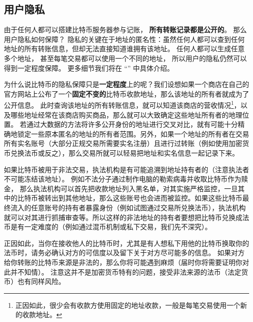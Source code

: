 \subsection{用户隐私}
由于任何人都可以搭建比特币服务器参与记账， \textbf{所有转账记录都是公开的}。 那么用户隐私如何保障？ 隐私的关键在于地址的匿名性：虽然任何人都可以查到任何地址的所有转账信息，但却无法直接知道谁拥有该地址。 任何人都可以生成任意多个地址， 甚至每笔交易都可以使用一个不同的地址， 所以用户的隐私仍然可以得到一定程度保障。 更多细节我们将在 “” 中具体介绍。

为什么说比特币的隐私保障只是\textbf{一定程度}上的呢？我们设想如果一个商店在自己的官方网站上公布了一个\textbf{固定不变的}比特币收款地址，那么该地址的所有者就成为了公开信息。 此时查询该地址的所有转账信息，就可以知道该商店的营收情况\footnote{正因如此，很少会有收款方使用固定的地址收款，一般是每笔交易使用一个新的收款地址。}，以及哪些地址经常在该商店购买商品，那么就可以大致确定这些地址所有者的地理位置。 若通过大数据的方法将许多公开身份的地址进行交叉对比，就有可能十分精确地锁定一些原本匿名的地址的所有者范围。另外，如果一个地址的所有者在交易所有实名账号（大部分正规交易所需要实名注册）且进行过转账（例如使用加密货币兑换法币或反之），那么交易所就可以轻易把地址和实名信息一起记录下来。

如果比特币被用于非法交易，执法机构是有可能追溯到地址持有者的（注意执法者不可能冻结该地址）。 例如不法分子通过制作电脑的勒索病毒并收取比特币作为赎金， 那么执法机构可以首先把收款地址列入黑名单，对其实施严格监控，一旦其中的比特币被转出到其他地址，那么这些账号也会进而被监控。如果这些比特币最终流入的任意账号的持有者暴露身份（例如试图通过交易所兑换法币），执法机构就可以对其进行抓捕审查等。所以这样的非法地址的持有者要想把比特币兑换成法币是有一定难度的（例如通过混币机制或私下交易，我们先不深究）。

正因如此，当你在接收他人的比特币时，尤其是有人想私下用他的比特币换取你的法币时，请务必确认对方的可信度以及留下关于对方尽可能多的信息。 如果对方给你转账的比特币来源是非法的，那么你将可能遇到麻烦（届时你将需要证明你对此并不知情）。 注意这并不是加密货币特有的问题，接受非法来源的法币（法定货币）也有同样风险。

